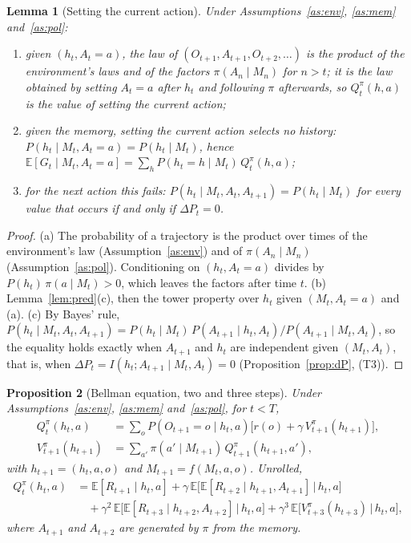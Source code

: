 \documentclass{article}
\newtheorem{proposition}{Proposition}[section]
\newtheorem{lemma}[proposition]{Lemma}
\theoremstyle{definition}
\theoremstyle{remark}
\newcommand{\E}{\mathbb{E}}
\newcommand{\dP}{\Delta P}
\begin{document}
\begin{lemma}[Setting the current action]\label{lem:do}
Under Assumptions~\ref{as:env}, \ref{as:mem} and~\ref{as:pol}:
\begin{enumerate}
\item[(a)] given $(h_t,A_t=a)$, the law of $(O_{t+1},A_{t+1},O_{t+2},\dots)$ is the product of the environment's laws and of the factors $\pi(A_n\mid M_n)$ for $n>t$; it is the law obtained by setting $A_t=a$ after $h_t$ and following $\pi$ afterwards, so $Q^\pi_t(h,a)$ is the value of setting the current action;
\item[(b)] given the memory, setting the current action selects no history: $P(h_t\mid M_t,A_t=a)=P(h_t\mid M_t)$, hence $\E[G_t\mid M_t,A_t=a]=\sum_hP(h_t=h\mid M_t)\,Q^\pi_t(h,a)$;
\item[(c)] for the next action this fails: $P(h_t\mid M_t,A_t,A_{t+1})=P(h_t\mid M_t)$ for every value that occurs if and only if $\dP_t=0$.
\end{enumerate}
\end{lemma}

\begin{proof}
(a) The probability of a trajectory is the product over times of the environment's law (Assumption~\ref{as:env}) and of $\pi(A_n\mid M_n)$ (Assumption~\ref{as:pol}). Conditioning on $(h_t,A_t=a)$ divides by $P(h_t)\,\pi(a\mid M_t)>0$, which leaves the factors after time $t$. (b) Lemma~\ref{lem:pred}(c), then the tower property over $h_t$ given $(M_t,A_t=a)$ and (a). (c) By Bayes' rule, $P(h_t\mid M_t,A_t,A_{t+1})=P(h_t\mid M_t)\,P(A_{t+1}\mid h_t,A_t)/P(A_{t+1}\mid M_t,A_t)$, so the equality holds exactly when $A_{t+1}$ and $h_t$ are independent given $(M_t,A_t)$, that is, when $\dP_t=I(h_t;A_{t+1}\mid M_t,A_t)=0$ (Proposition~\ref{prop:dP}, (T3)).
\end{proof}

\begin{proposition}[Bellman equation, two and three steps]\label{prop:bellman-h}
Under Assumptions~\ref{as:env}, \ref{as:mem} and~\ref{as:pol}, for $t<T$,
\begin{align*}
Q^\pi_t(h_t,a)&=\sum_oP(O_{t+1}=o\mid h_t,a)\big[r(o)+\gamma\,V^\pi_{t+1}(h_{t+1})\big],\\
V^\pi_{t+1}(h_{t+1})&=\sum_{a'}\pi(a'\mid M_{t+1})\,Q^\pi_{t+1}(h_{t+1},a'),
\end{align*}
with $h_{t+1}=(h_t,a,o)$ and $M_{t+1}=f(M_t,a,o)$. Unrolled,
\begin{align*}
Q^\pi_t(h_t,a)&=\E[R_{t+1}\mid h_t,a]+\gamma\,\E\big[\E[R_{t+2}\mid h_{t+1},A_{t+1}]\,\big|\,h_t,a\big]\\
&\quad+\gamma^2\,\E\big[\E[R_{t+3}\mid h_{t+2},A_{t+2}]\,\big|\,h_t,a\big]+\gamma^3\,\E\big[V^\pi_{t+3}(h_{t+3})\,\big|\,h_t,a\big],
\end{align*}
where $A_{t+1}$ and $A_{t+2}$ are generated by $\pi$ from the memory.
\end{proposition}
\end{document}

